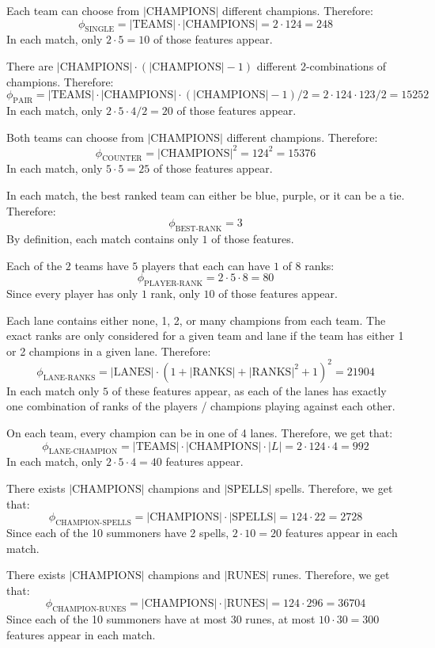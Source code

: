 Each team can choose from $|\text{CHAMPIONS}|$ different champions. Therefore:
\[\phi_{\text{SINGLE}} = |\text{TEAMS}| \cdot |\text{CHAMPIONS}| = 2 \cdot 124 = 248\] 
In each match, only $2 \cdot 5 = 10$ of those features appear.

There are $|\text{CHAMPIONS}| \cdot (|\text{CHAMPIONS}|-1)$ different 2-combinations of champions. Therefore:
\[\phi_{\text{PAIR}} = |\text{TEAMS}| \cdot |\text{CHAMPIONS}| \cdot (|\text{CHAMPIONS}|-1) / 2 = 2 \cdot 124 \cdot 123 / 2 = 15252\] 
In each match, only $2 \cdot 5 \cdot 4 / 2 = 20$ of those features appear.

Both teams can choose from $|\text{CHAMPIONS}|$ different champions. Therefore:
\[\phi_{\text{COUNTER}} = |\text{CHAMPIONS}|^2 = 124^2 = 15376\] 
In each match, only $5 \cdot 5 = 25$ of those features appear.

In each match, the best ranked team can either be blue, purple, or it can be a tie. Therefore:
\[\phi_{\text{BEST-RANK}} = 3\] 
By definition, each match contains only $1$ of those features.

Each of the $2$ teams have $5$ players that each can have $1$ of $8$ ranks:
\[\phi_{\text{PLAYER-RANK}} = 2 \cdot 5 \cdot 8 = 80\] 
Since every player has only $1$ rank, only $10$ of those features appear.

Each lane contains either none, 1, 2, or many champions from each team. The exact ranks are only considered for a given team and lane if the team has either 1 or 2 champions in a given lane. Therefore:
\[\phi_{\text{LANE-RANKS}} = |\text{LANES}| \cdot (1 + |\text{RANKS}| + |\text{RANKS}|^2 + 1)^2 = 21904\]
In each match only $5$ of these features appear, as each of the lanes has exactly one combination of ranks of the players / champions playing against each other.

On each team, every champion can be in one of 4 lanes. Therefore, we get that:
\[\phi_{\text{LANE-CHAMPION}} = |\text{TEAMS}| \cdot |\text{CHAMPIONS}| \cdot |L| = 2 \cdot 124 \cdot 4 = 992\]
In each match, only $2 \cdot 5 \cdot 4 = 40$ features appear.

There exists $|\text{CHAMPIONS}|$ champions and $|\text{SPELLS}|$ spells. Therefore, we get that:
\[\phi_{\text{CHAMPION-SPELLS}} = |\text{CHAMPIONS}| \cdot |\text{SPELLS}| = 124 \cdot 22 = 2728\]
Since each of the 10 summoners have 2 spells, $2 \cdot 10 = 20$ features appear in each match.

There exists $|\text{CHAMPIONS}|$ champions and $|\text{RUNES}|$ runes. Therefore, we get that:
\[\phi_{\text{CHAMPION-RUNES}} = |\text{CHAMPIONS}| \cdot |\text{RUNES}| = 124 \cdot 296 = 36704\]
Since each of the 10 summoners have at most 30 runes, at most $10 \cdot 30 = 300$ features appear in each match.

